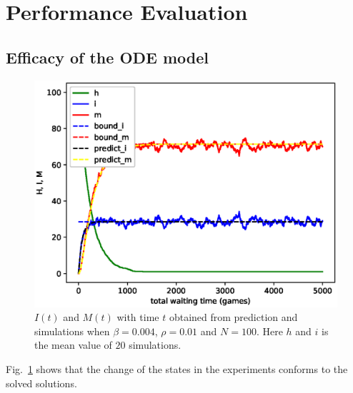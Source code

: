 \section{Performance Evaluation}
\subsection{Efficacy of the ODE model}
\label{subsec:pe_valid}
\begin{figure}
  \includegraphics[width=.45\textwidth]{fig/twohop_predict_sim.eps}
  \caption{$I(t)$ and $M(t)$ with time $t$ obtained from prediction and simulations
  when $\beta = 0.004$, $\rho = 0.01$ and $N=100$. Here $h$ and $i$ is the mean value of $20$ simulations.}
  \label{fig:twohop_predict_wod}
\end{figure}
Fig.~\ref{fig:twohop_predict_wod} shows that the change of the states
in the experiments conforms to
the solved solutions.

